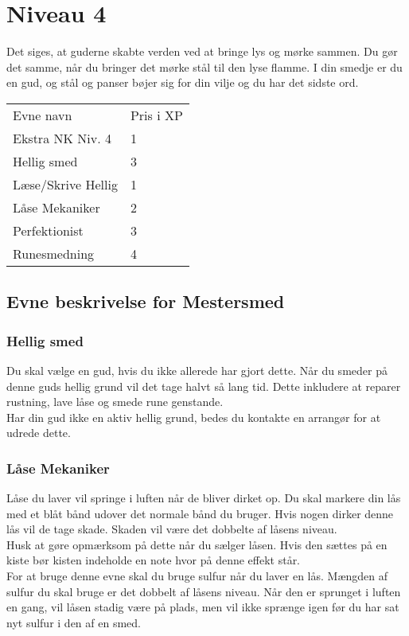 \chapter*{Niveau 4}
Det siges, at guderne skabte verden ved at bringe lys og mørke sammen. Du gør det samme, når du bringer det mørke stål til den lyse flamme. I din smedje er du en gud, og stål og panser bøjer sig for din vilje og du har det sidste ord.\\


\begin{tabular}{|p{}|p{}|}
\hline
\rowcolor{cerulean!80}
 \multicolumn{2}{|c|}{ Mestersmed } \\
\hline
\rowcolor{cerulean!40}
    Evne navn & Pris i XP\\ \hline
    Ekstra NK Niv. 4 & 1\\\hline
    Hellig smed & 3 \\\hline
    Læse/Skrive Hellig  & 1\\\hline
    Låse Mekaniker & 2 \\\hline
    Perfektionist & 3 \\\hline
    Runesmedning   & 4\\\hline
\end{tabular}

\section*{Evne beskrivelse for Mestersmed}



\subsection*{Hellig smed}
Du skal vælge en gud, hvis du ikke allerede har gjort dette. Når du smeder på denne guds hellig grund vil det tage halvt så lang tid. Dette inkludere at reparer rustning, lave låse og smede rune genstande.\\
Har din gud ikke en aktiv hellig grund, bedes du kontakte en arrangør for at udrede dette.



\subsection*{Låse Mekaniker}
Låse du laver vil springe i luften når de bliver dirket op. Du skal markere din lås med et blåt bånd udover det normale bånd du bruger. Hvis nogen dirker denne lås vil de tage skade. Skaden vil være det dobbelte af låsens niveau.\\
Husk at gøre opmærksom på dette når du sælger låsen. Hvis den sættes på en kiste bør kisten indeholde en note hvor på denne effekt står.\\
For at bruge denne evne skal du bruge sulfur når du laver en lås. Mængden af sulfur du skal bruge er det dobbelt af låsens niveau. Når den er sprunget i luften en gang, vil låsen stadig være på plads, men vil ikke sprænge igen før du har sat nyt sulfur i den af en smed.


